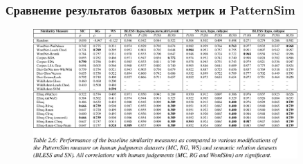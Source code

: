 \begin{frame}
\frametitle{Сравнение результатов базовых метрик и PatternSim}

\begin{figure}  
\centering
\includegraphics[width=0.9\textwidth]{figures/patternsim-results-table}
\end{figure}

\end{frame}


